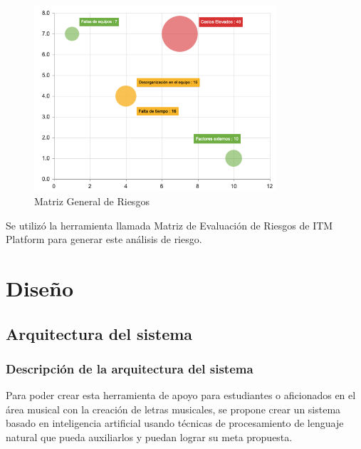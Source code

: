 \documentclass[12pt, a4paper, titlepage]{report}
\begin{document}
    	\begin{figure}[H]
    		\includegraphics[width=9cm]{./imagenes/Analisis/AnalisisRiesgo/analisisriesgos.png}
    		\centering 
    		\caption{Matriz General de Riesgos}
    	\end{figure}
    
    	Se utilizó la herramienta llamada Matriz de Evaluación de Riesgos de ITM Platform para generar este análisis de riesgo. \cite{refMatrizEvaluacionRiesgos}
\newpage

\chapter{\textcolor{azulescom}{Diseño}}

\section{Arquitectura del sistema}
		\subsection{Descripción de la arquitectura del sistema}
		Para poder crear esta herramienta de apoyo para estudiantes o aficionados en el área musical con la creación de letras musicales, se propone crear un sistema basado en inteligencia artificial usando técnicas de procesamiento de lenguaje natural que pueda auxiliarlos y puedan lograr su meta propuesta.
		
\end{document}
